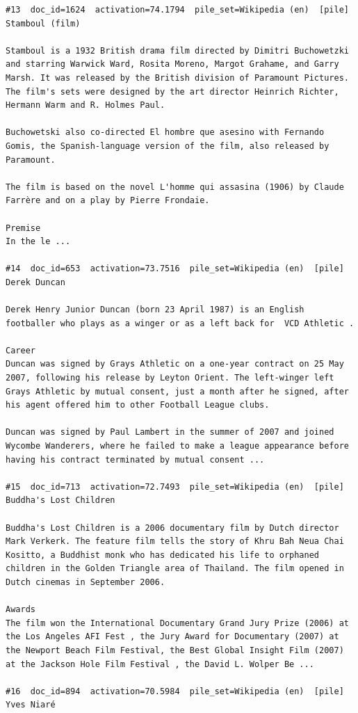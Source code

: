 \begin{verbatim}
#13  doc_id=1624  activation=74.1794  pile_set=Wikipedia (en)  [pile]
Stamboul (film)

Stamboul is a 1932 British drama film directed by Dimitri Buchowetzki and starring Warwick Ward, Rosita Moreno, Margot Grahame, and Garry Marsh. It was released by the British division of Paramount Pictures. The film's sets were designed by the art director Heinrich Richter, Hermann Warm and R. Holmes Paul.

Buchowetski also co-directed El hombre que asesino with Fernando Gomis, the Spanish-language version of the film, also released by Paramount. 

The film is based on the novel L'homme qui assasina (1906) by Claude Farrère and on a play by Pierre Frondaie.

Premise
In the le ...

#14  doc_id=653  activation=73.7516  pile_set=Wikipedia (en)  [pile]
Derek Duncan

Derek Henry Junior Duncan (born 23 April 1987) is an English footballer who plays as a winger or as a left back for  VCD Athletic .

Career
Duncan was signed by Grays Athletic on a one-year contract on 25 May 2007, following his release by Leyton Orient. The left-winger left Grays Athletic by mutual consent, just a month after he signed, after his agent offered him to other Football League clubs.

Duncan was signed by Paul Lambert in the summer of 2007 and joined Wycombe Wanderers, where he failed to make a league appearance before having his contract terminated by mutual consent ...

#15  doc_id=713  activation=72.7493  pile_set=Wikipedia (en)  [pile]
Buddha's Lost Children

Buddha's Lost Children is a 2006 documentary film by Dutch director Mark Verkerk. The feature film tells the story of Khru Bah Neua Chai Kositto, a Buddhist monk who has dedicated his life to orphaned children in the Golden Triangle area of Thailand. The film opened in Dutch cinemas in September 2006.

Awards
The film won the International Documentary Grand Jury Prize (2006) at the Los Angeles AFI Fest , the Jury Award for Documentary (2007) at the Newport Beach Film Festival, the Best Global Insight Film (2007) at the Jackson Hole Film Festival , the David L. Wolper Be ...

#16  doc_id=894  activation=70.5984  pile_set=Wikipedia (en)  [pile]
Yves Niaré


\end{verbatim}
